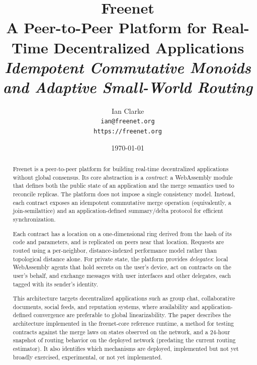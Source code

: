 \documentclass[11pt,a4paper]{article}
\title{\textbf{Freenet}\\[2pt]
\large A Peer-to-Peer Platform for Real-Time Decentralized Applications\\[2pt]
\normalsize\itshape Idempotent Commutative Monoids and Adaptive Small-World Routing}
\author{Ian Clarke\\[2pt]\small\texttt{ian@freenet.org}\\\small\texttt{https://freenet.org}}
\date{\today}
\begin{document}
\maketitle

\begin{abstract}
\noindent
Freenet is a peer-to-peer platform for building real-time decentralized
applications without global consensus. Its core abstraction is a \emph{contract}:
a WebAssembly module that defines both the public state of an application and the
merge semantics used to reconcile replicas. The platform does not impose a single
consistency model. Instead, each contract exposes an idempotent
commutative merge operation (equivalently, a join-semilattice) and an
application-defined summary/delta protocol for efficient synchronization.

Each contract has a location on a one-dimensional ring derived from the hash
of its code and parameters, and is replicated on peers near that location. Requests are routed using a per-neighbor,
distance-indexed performance model rather than topological distance alone. For
private state, the platform provides \emph{delegates}: local WebAssembly agents
that hold secrets on the user's device, act on contracts on the user's behalf, and
exchange messages with user interfaces and other delegates, each tagged with
its sender's identity.

This architecture targets decentralized applications such as group chat,
collaborative documents, social feeds, and reputation systems, where
availability and application-defined convergence are preferable to global
linearizability.
The paper describes the architecture implemented in the freenet-core reference
runtime, a method for testing contracts against the merge laws on states observed
on the network, and a 24-hour snapshot of routing behavior on the deployed
network (predating the current routing estimator). It also identifies which mechanisms are deployed, implemented but not yet broadly
exercised, experimental, or not yet implemented.
\end{abstract}

\vspace{0.5em}














\end{document}

